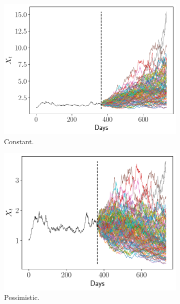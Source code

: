 \documentclass[11pt]{article}
\theoremstyle{definition}
\theoremstyle{remark}
\theoremstyle{remark}
\begin{document}
\begin{figure}[H]
  \centering
  \begin{subfigure}[b]{0.45\textwidth}
      \centering
      \includegraphics[scale=0.45]{pronostico-constante.pdf}
      \caption{Constant.}
  \end{subfigure}
  \begin{subfigure}[b]{0.45\textwidth}
      \centering
      \includegraphics[scale=0.45]{pronostico-pesimista.pdf}
      \caption{Pessimistic.}
  \end{subfigure}
  \begin{subfigure}[b]{0.45\textwidth}
      \centering

\end{subfigure}
\end{figure}
\end{document}
